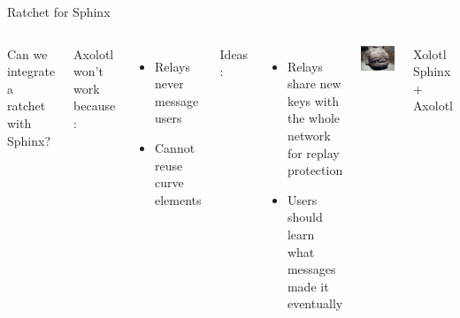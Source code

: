 \documentclass[fleqn,xcolor={usenames,dvipsnames}]{beamer}
\begin{document}
\begin{frame}[t]{Ratchet for Sphinx }
\begin{columns}[T]

Can we integrate a ratchet with Sphinx?

\medskip
Axolotl won't work because : 
\begin{itemize}
\item Relays never message users
\item Cannot reuse curve elements
\end{itemize}

\medskip
Ideas : 
\begin{itemize}
\item Relays share new keys with the whole network for replay protection \\
\item Users should learn what messages made it eventually
\end{itemize}

\includegraphics[width=1.35\textwidth,trim={80 0 0 0},clip]{../pics/Xolotl_muz}
\begin{center}
Xolotl \\
Sphinx + Axolotl
\end{center}
\end{columns}

\end{frame}
\end{document}
